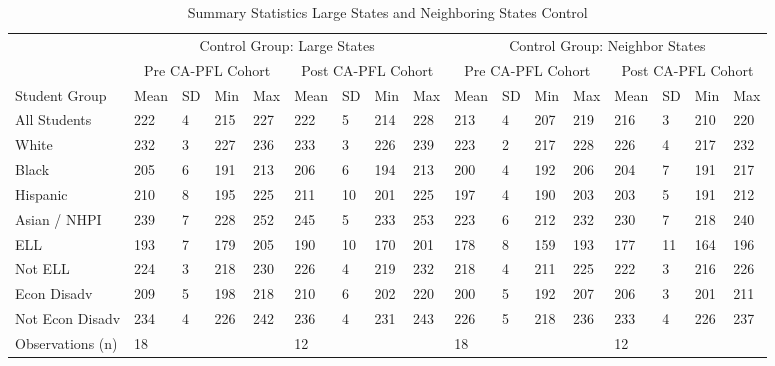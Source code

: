 \begin{table}[!h]
\centering
\caption{Summary Statistics Large States and Neighboring States Control}
\centering
\begin{tabular}[t]{lllllllllllllllll}
\toprule
\multicolumn{1}{c}{ } & \multicolumn{8}{c}{Control Group: Large States} & \multicolumn{8}{c}{Control Group: Neighbor States} \\
\cmidrule(l{3pt}r{3pt}){2-9} \cmidrule(l{3pt}r{3pt}){10-17}
\multicolumn{1}{c}{ } & \multicolumn{4}{c}{Pre CA-PFL Cohort} & \multicolumn{4}{c}{Post CA-PFL Cohort} & \multicolumn{4}{c}{Pre CA-PFL Cohort} & \multicolumn{4}{c}{Post CA-PFL Cohort} \\
\cmidrule(l{3pt}r{3pt}){2-5} \cmidrule(l{3pt}r{3pt}){6-9} \cmidrule(l{3pt}r{3pt}){10-13} \cmidrule(l{3pt}r{3pt}){14-17}
Student Group & Mean & SD & Min & Max & Mean & SD & Min & Max & Mean & SD & Min & Max & Mean & SD & Min & Max\\
\midrule
All Students & 222 & 4 & 215 & 227 & 222 & 5 & 214 & 228 & 213 & 4 & 207 & 219 & 216 & 3 & 210 & 220\\
White & 232 & 3 & 227 & 236 & 233 & 3 & 226 & 239 & 223 & 2 & 217 & 228 & 226 & 4 & 217 & 232\\
Black & 205 & 6 & 191 & 213 & 206 & 6 & 194 & 213 & 200 & 4 & 192 & 206 & 204 & 7 & 191 & 217\\
Hispanic & 210 & 8 & 195 & 225 & 211 & 10 & 201 & 225 & 197 & 4 & 190 & 203 & 203 & 5 & 191 & 212\\
Asian / NHPI & 239 & 7 & 228 & 252 & 245 & 5 & 233 & 253 & 223 & 6 & 212 & 232 & 230 & 7 & 218 & 240\\
\addlinespace
ELL & 193 & 7 & 179 & 205 & 190 & 10 & 170 & 201 & 178 & 8 & 159 & 193 & 177 & 11 & 164 & 196\\
Not ELL & 224 & 3 & 218 & 230 & 226 & 4 & 219 & 232 & 218 & 4 & 211 & 225 & 222 & 3 & 216 & 226\\
Econ Disadv & 209 & 5 & 198 & 218 & 210 & 6 & 202 & 220 & 200 & 5 & 192 & 207 & 206 & 3 & 201 & 211\\
Not Econ Disadv & 234 & 4 & 226 & 242 & 236 & 4 & 231 & 243 & 226 & 5 & 218 & 236 & 233 & 4 & 226 & 237\\
Observations (n) & 18 &  &  &  & 12 &  &  &  & 18 &  &  &  & 12 &  &  & \\
\bottomrule
\end{tabular}
\end{table}
